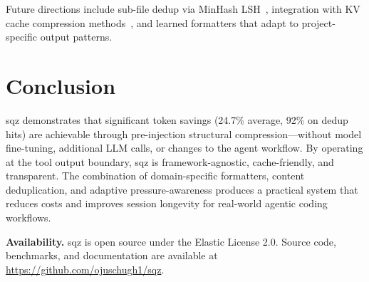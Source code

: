 \documentclass[10pt,twocolumn]{article}
\begin{document}
Future directions include sub-file dedup via MinHash LSH~\cite{minhash2025}, integration with KV cache compression methods~\cite{chen2025codecomp}, and learned formatters that adapt to project-specific output patterns.

\section{Conclusion}

sqz demonstrates that significant token savings (24.7\% average, 92\% on dedup hits) are achievable through pre-injection structural compression---without model fine-tuning, additional LLM calls, or changes to the agent workflow. By operating at the tool output boundary, sqz is framework-agnostic, cache-friendly, and transparent. The combination of domain-specific formatters, content deduplication, and adaptive pressure-awareness produces a practical system that reduces costs and improves session longevity for real-world agentic coding workflows.

\medskip
\noindent\textbf{Availability.} sqz is open source under the Elastic License 2.0. Source code, benchmarks, and documentation are available at \url{https://github.com/ojuschugh1/sqz}.



\end{document}
